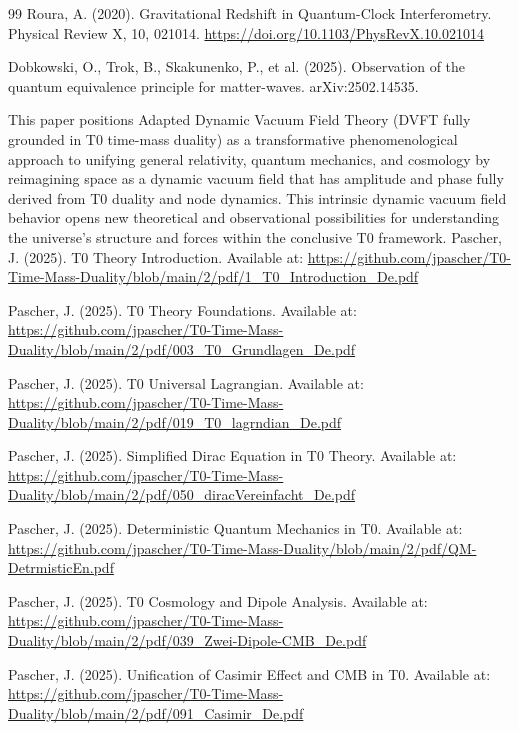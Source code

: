 \begin{thebibliography}{99}
		Roura, A. (2020). Gravitational Redshift in Quantum-Clock Interferometry. Physical Review X, 10, 021014. \url{https://doi.org/10.1103/PhysRevX.10.021014}
		
		Dobkowski, O., Trok, B., Skakunenko, P., et al. (2025). Observation of the quantum equivalence principle for matter-waves. arXiv:2502.14535.
		
		This paper positions Adapted Dynamic Vacuum Field Theory (DVFT fully grounded in T0 time-mass duality) as a transformative phenomenological approach to unifying general relativity, quantum mechanics, and cosmology by reimagining space as a dynamic vacuum field that has amplitude and phase fully derived from T0 duality and node dynamics. This intrinsic dynamic vacuum field behavior opens new theoretical and observational possibilities for understanding the universe’s structure and forces within the conclusive T0 framework.
		Pascher, J. (2025). T0 Theory Introduction. Available at: \url{https://github.com/jpascher/T0-Time-Mass-Duality/blob/main/2/pdf/1_T0_Introduction_De.pdf}
		
		Pascher, J. (2025). T0 Theory Foundations. Available at: \url{https://github.com/jpascher/T0-Time-Mass-Duality/blob/main/2/pdf/003_T0_Grundlagen_De.pdf}
		
		Pascher, J. (2025). T0 Universal Lagrangian. Available at: \url{https://github.com/jpascher/T0-Time-Mass-Duality/blob/main/2/pdf/019_T0_lagrndian_De.pdf}
		
		Pascher, J. (2025). Simplified Dirac Equation in T0 Theory. Available at: \url{https://github.com/jpascher/T0-Time-Mass-Duality/blob/main/2/pdf/050_diracVereinfacht_De.pdf}
		
		Pascher, J. (2025). Deterministic Quantum Mechanics in T0. Available at: \url{https://github.com/jpascher/T0-Time-Mass-Duality/blob/main/2/pdf/QM-DetrmisticEn.pdf}
		
		Pascher, J. (2025). T0 Cosmology and Dipole Analysis. Available at: \url{https://github.com/jpascher/T0-Time-Mass-Duality/blob/main/2/pdf/039_Zwei-Dipole-CMB_De.pdf}
		
		Pascher, J. (2025). Unification of Casimir Effect and CMB in T0. Available at: \url{https://github.com/jpascher/T0-Time-Mass-Duality/blob/main/2/pdf/091_Casimir_De.pdf}
		

\end{thebibliography}
